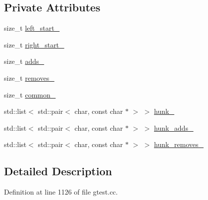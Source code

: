 \subsection*{Private Attributes}
\begin{DoxyCompactItemize}
\item 
size\+\_\+t \hyperlink{classtesting_1_1internal_1_1edit__distance_1_1anonymous__namespace_02gtest_8cc_03_1_1Hunk_a735e2ea405bdd59b97bbdcbd9401009a}{left\+\_\+start\+\_\+}
\item 
size\+\_\+t \hyperlink{classtesting_1_1internal_1_1edit__distance_1_1anonymous__namespace_02gtest_8cc_03_1_1Hunk_a8300f282fe8060dadaedb15dd00fdb33}{right\+\_\+start\+\_\+}
\item 
size\+\_\+t \hyperlink{classtesting_1_1internal_1_1edit__distance_1_1anonymous__namespace_02gtest_8cc_03_1_1Hunk_aebe5a95d3f4d959662f95e4d6b759c87}{adds\+\_\+}
\item 
size\+\_\+t \hyperlink{classtesting_1_1internal_1_1edit__distance_1_1anonymous__namespace_02gtest_8cc_03_1_1Hunk_afef2d4c5c0b9cb9567d4f778f6748828}{removes\+\_\+}
\item 
size\+\_\+t \hyperlink{classtesting_1_1internal_1_1edit__distance_1_1anonymous__namespace_02gtest_8cc_03_1_1Hunk_a027909c2722c8549d8ca490ffa14b134}{common\+\_\+}
\item 
std\+::list$<$ std\+::pair$<$ char, const char $\ast$ $>$ $>$ \hyperlink{classtesting_1_1internal_1_1edit__distance_1_1anonymous__namespace_02gtest_8cc_03_1_1Hunk_a212b858a6076f325fd6544dd35290761}{hunk\+\_\+}
\item 
std\+::list$<$ std\+::pair$<$ char, const char $\ast$ $>$ $>$ \hyperlink{classtesting_1_1internal_1_1edit__distance_1_1anonymous__namespace_02gtest_8cc_03_1_1Hunk_aec370e5d76c490b9dd99fbe8f15f66e1}{hunk\+\_\+adds\+\_\+}
\item 
std\+::list$<$ std\+::pair$<$ char, const char $\ast$ $>$ $>$ \hyperlink{classtesting_1_1internal_1_1edit__distance_1_1anonymous__namespace_02gtest_8cc_03_1_1Hunk_ad0fcc5e7b40f3dc29372ab5393efcb1f}{hunk\+\_\+removes\+\_\+}
\end{DoxyCompactItemize}


\subsection{Detailed Description}


Definition at line 1126 of file gtest.\+cc.



